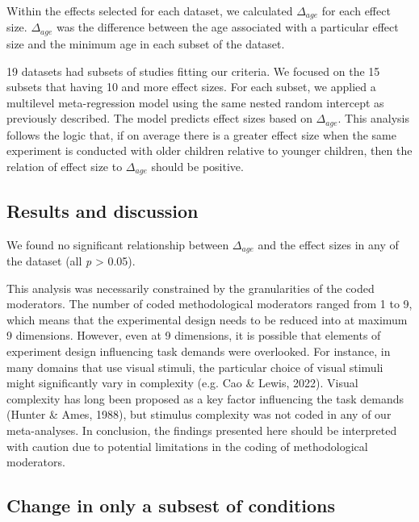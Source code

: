 \documentclass[
  man]{apa6}
\begin{document}
Within the effects selected for each dataset, we calculated \(\Delta_{age}\) for each effect size. \(\Delta_{age}\) was the difference between the age associated with a particular effect size and the minimum age in each subset of the dataset.

19 datasets had subsets of studies fitting our criteria. We focused on the 15 subsets that having 10 and more effect sizes. For each subset, we applied a multilevel meta-regression model using the same nested random intercept as previously described. The model predicts effect sizes based on \(\Delta_{age}\). This analysis follows the logic that, if on average there is a greater effect size when the same experiment is conducted with older children relative to younger children, then the relation of effect size to \(\Delta_{age}\) should be positive.

\hypertarget{results-and-discussion-1}{%
\subsection{Results and discussion}\label{results-and-discussion-1}}

We found no significant relationship between \(\Delta_{age}\) and the effect sizes in any of the dataset (all \emph{p} \textgreater{} 0.05).

This analysis was necessarily constrained by the granularities of the coded moderators. The number of coded methodological moderators ranged from 1 to 9, which means that the experimental design needs to be reduced into at maximum 9 dimensions. However, even at 9 dimensions, it is possible that elements of experiment design influencing task demands were overlooked. For instance, in many domains that use visual stimuli, the particular choice of visual stimuli might significantly vary in complexity (e.g. Cao \& Lewis, 2022). Visual complexity has long been proposed as a key factor influencing the task demands (Hunter \& Ames, 1988), but stimulus complexity was not coded in any of our meta-analyses. In conclusion, the findings presented here should be interpreted with caution due to potential limitations in the coding of methodological moderators.

\hypertarget{change-in-only-a-subsest-of-conditions}{%
\subsection{Change in only a subsest of conditions}\label{change-in-only-a-subsest-of-conditions}}
\end{document}
